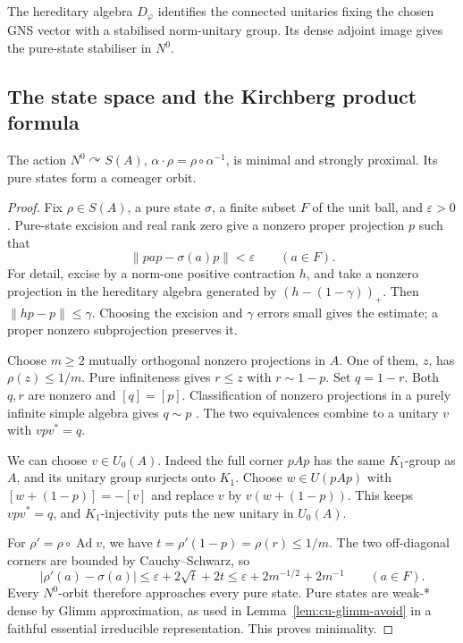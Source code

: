 The hereditary algebra \(D_\varphi\) identifies the connected
unitaries fixing the chosen GNS vector with a stabilised norm-unitary
group. Its dense adjoint image gives the pure-state stabiliser in
\(N^0\).


\subsection{The state space and the Kirchberg product formula}
\label{sec:un-kirchberg-product}

\begin{lemma}\label{lem:un-state-minimal}
The action \(N^0\curvearrowright S(A)\),
\(\alpha\cdot\rho=\rho\circ\alpha^{-1}\), is minimal and strongly
proximal. Its pure states form a comeager orbit.
\end{lemma}
\begin{proof}
Fix \(\rho\in S(A)\), a pure state \(\sigma\), a finite subset \(F\)
of the unit ball, and \(\varepsilon>0\). Pure-state excision
\cite{AkemannAndersonPedersen1986} and real rank zero \cite[Theorem 1.2]{Zhang1992} give a nonzero proper projection \(p\)
such that
\[
 \left\lVert pap-\sigma(a)p\right\rVert<\varepsilon\qquad(a\in F).
\]
For detail, excise by a norm-one positive contraction \(h\), and take
a nonzero projection in the hereditary algebra generated by
\((h-(1-\gamma))_+\). Then \(\left\lVert hp-p\right\rVert\leq\gamma\).
Choosing the excision and \(\gamma\) errors small gives the estimate;
a proper nonzero subprojection preserves it.

Choose \(m\geq2\) mutually orthogonal nonzero projections in \(A\).
One of them, \(z\), has \(\rho(z)\leq1/m\).
Pure infiniteness gives \(r\leq z\) with \(r\sim1-p\).
Set \(q=1-r\). Both \(q,r\) are nonzero and
\([q]=[p]\). Classification of nonzero projections in a purely
infinite simple algebra gives \(q\sim p\)
\cite[Corollary 6.11.9]{Blackadar1998}.
The two equivalences combine to a unitary \(v\) with \(vpv^*=q\).

We can choose \(v\in U_0(A)\). Indeed the full corner \(pAp\) has
the same \(K_1\)-group as \(A\), and its unitary group surjects onto
\(K_1\). Choose \(w\in U(pAp)\) with
\([w+(1-p)]=-[v]\) and replace \(v\) by \(v(w+(1-p))\).
This keeps \(vpv^*=q\), and \(K_1\)-injectivity puts the new
unitary in \(U_0(A)\).

For \(\rho'=\rho\circ\operatorname{Ad} v\), we have
\(t=\rho'(1-p)=\rho(r)\leq1/m\). The two off-diagonal corners are
bounded by Cauchy--Schwarz, so
\[
 |\rho'(a)-\sigma(a)|
 \leq \varepsilon+2\sqrt t+2t
 \leq \varepsilon+2m^{-1/2}+2m^{-1}\qquad(a\in F).
\]
Every \(N^0\)-orbit therefore approaches every pure state.
Pure states are weak-* dense by Glimm approximation, as used in Lemma~\ref{lem:cu-glimm-avoid} in a
faithful essential irreducible representation. This proves minimality.


\end{proof}
